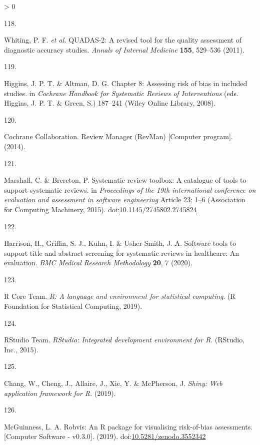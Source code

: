 \documentclass[a4paper, twoside]{templates/ociamthesis}
\newlength{\cslhangindent}
\newlength{\csllabelwidth}
\newenvironment{CSLReferences}[3] %
 {%
  \setlength{\parindent}{0pt}
  \ifodd #1 \everypar{\setlength{\hangindent}{\cslhangindent}}\ignorespaces\fi
  \ifnum #2 > 0
  \setlength{\parskip}{#2\baselineskip}
  \fi
 }%
 {}
\newcommand{\CSLLeftMargin}[1]{\parbox[t]{\maxof{\widthof{#1}}{\csllabelwidth}}{#1}}
\newcommand{\CSLRightInline}[1]{\parbox[t]{\linewidth - \csllabelwidth}{#1}}
\begin{document}
\begin{CSLReferences}{0}{0}
\leavevmode\hypertarget{ref-whiting2011quadas}{}%
\CSLLeftMargin{118. }
\CSLRightInline{Whiting, P. F. \emph{et al.} {QUADAS}-2: A revised tool for the quality assessment of diagnostic accuracy studies. \emph{Annals of Internal Medicine} \textbf{155}, 529--536 (2011).}

\leavevmode\hypertarget{ref-higgins2008assessing}{}%
\CSLLeftMargin{119. }
\CSLRightInline{Higgins, J. P. T. \& Altman, D. G. Chapter 8: {Assessing} risk of bias in included studies. in \emph{Cochrane {Handbook} for {Systematic Reviews} of {Interventions}} (eds. Higgins, J. P. T. \& Green, S.) 187--241 ({Wiley Online Library}, 2008).}

\leavevmode\hypertarget{ref-cochrane2014review}{}%
\CSLLeftMargin{120. }
\CSLRightInline{Cochrane Collaboration. Review {Manager} ({RevMan}) {[}{Computer} program{]}. (2014).}

\leavevmode\hypertarget{ref-marshall2015systematic}{}%
\CSLLeftMargin{121. }
\CSLRightInline{Marshall, C. \& Brereton, P. Systematic review toolbox: A catalogue of tools to support systematic reviews. in \emph{Proceedings of the 19th international conference on evaluation and assessment in software engineering} Article 23; 1--6 ({Association for Computing Machinery}, 2015). doi:\href{https://doi.org/10.1145/2745802.2745824}{10.1145/2745802.2745824}}

\leavevmode\hypertarget{ref-harrison2020software}{}%
\CSLLeftMargin{122. }
\CSLRightInline{Harrison, H., Griffin, S. J., Kuhn, I. \& Usher-Smith, J. A. Software tools to support title and abstract screening for systematic reviews in healthcare: An evaluation. \emph{BMC Medical Research Methodology} \textbf{20}, 7 (2020).}

\leavevmode\hypertarget{ref-rref}{}%
\CSLLeftMargin{123. }
\CSLRightInline{R Core Team. \emph{R: {A} language and environment for statistical computing}. ({R Foundation for Statistical Computing}, 2019).}

\leavevmode\hypertarget{ref-rstudioref}{}%
\CSLLeftMargin{124. }
\CSLRightInline{RStudio Team. \emph{{RStudio}: {Integrated} development environment for {R}}. ({RStudio, Inc.}, 2015).}

\leavevmode\hypertarget{ref-shinyref}{}%
\CSLLeftMargin{125. }
\CSLRightInline{Chang, W., Cheng, J., Allaire, J., Xie, Y. \& McPherson, J. \emph{Shiny: {Web} application framework for {R}}. (2019).}

\leavevmode\hypertarget{ref-mcguinness2019a}{}%
\CSLLeftMargin{126. }
\CSLRightInline{McGuinness, L. A. Robvis: {An R} package for visualising risk-of-bias assessments. {[}{Computer Software} - v0.3.0{]}. (2019). doi:\href{https://doi.org/10.5281/zenodo.3552342}{10.5281/zenodo.3552342}}


\end{CSLReferences}
\end{document}

